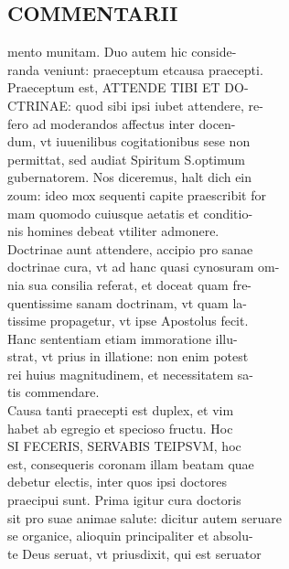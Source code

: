 \documentclass{article}
\begin{document}
\begin{pages}
\section*{COMMENTARII \\
                }
mento munitam. Duo autem hic conside- \\
                randa veniunt: praeceptum etcausa praecepti. \\
                Praeceptum est, ATTENDE TIBI ET DO- \\
                CTRINAE: quod sibi ipsi iubet attendere, re- \\
                fero ad moderandos affectus inter docen- \\
                dum, vt iuuenilibus cogitationibus sese non \\
                permittat, sed audiat Spiritum S.optimum \\
                gubernatorem. Nos diceremus, halt dich ein \\
                zoum: ideo mox sequenti capite praescribit for \\
                mam quomodo cuiusque aetatis et conditio- \\
                nis homines debeat vtiliter admonere. \\
                Doctrinae aunt attendere, accipio pro sanae \\
                doctrinae cura, vt ad hanc quasi cynosuram om- \\
                nia sua consilia referat, et doceat quam fre- \\
                quentissime sanam doctrinam, vt quam la- \\
                tissime propagetur, vt ipse Apostolus fecit. \\
                Hanc sententiam etiam immoratione illu- \\
                strat, vt prius in illatione: non enim potest \\
                rei huius magnitudinem, et necessitatem sa- \\
                tis commendare. \\
                Causa tanti praecepti est duplex, et vim \\
                habet ab egregio et specioso fructu. Hoc \\
                SI FECERIS, SERVABIS TEIPSVM, hoc \\
                est, consequeris coronam illam beatam quae \\
                debetur electis, inter quos ipsi doctores \\
                praecipui sunt. Prima igitur cura doctoris \\
                sit pro suae animae salute: dicitur autem seruare \\
                se organice, alioquin principaliter et absolu- \\
                te Deus seruat, vt priusdixit, qui est seruator \\
                

\end{pages}
\end{document}
